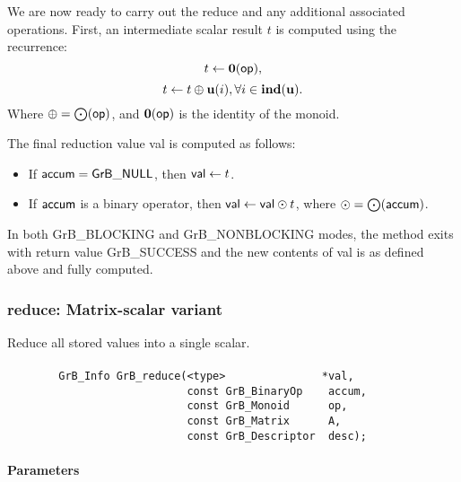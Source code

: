 We are now ready to carry out the reduce and any additional 
associated operations.  
First, an intermediate scalar result $t$ is computed using the recurrence:
\[
	t \leftarrow \bold{0}({\sf op}),
\]
\[
	t \leftarrow t \oplus {\bf u}(i), \forall i \in \bold{ind}({\bf u}). 
\]
Where $\oplus = \bigodot({\sf op})$, and $\bold{0}({\sf op})$ is the identity of the monoid.

The final reduction value {\sf val} is computed as follows:
\begin{itemize}
	\item If ${\sf accum} = {\sf GrB\_NULL}$, then ${\sf val} \leftarrow t$.

	\item If ${\sf accum}$ is a binary operator, then ${\sf val} \leftarrow {\sf val} \odot t$,
    where $\odot  = \bigodot({\sf accum})$. 
\end{itemize}

In both {\sf GrB\_BLOCKING} and {\sf GrB\_NONBLOCKING} modes, the method exits with return value 
{\sf GrB\_SUCCESS} and the new contents of {\sf val} is as defined above
and fully computed.



\subsubsection{{\sf reduce}: Matrix-scalar variant}
\label{Sec:Reduce_matrix_scalar}

Reduce all stored values into a single scalar.

\paragraph{\syntax}

\begin{verbatim}
        GrB_Info GrB_reduce(<type>               *val,
                            const GrB_BinaryOp    accum,
                            const GrB_Monoid      op,
                            const GrB_Matrix      A,
                            const GrB_Descriptor  desc);
\end{verbatim}

\paragraph{Parameters}

